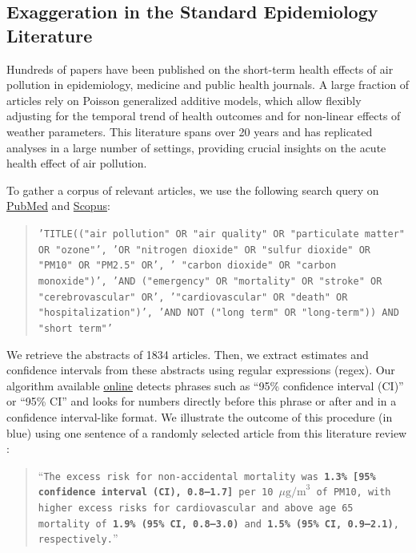 \documentclass[12pt]{article}
\begin{document}
    \subsection{Exaggeration in the Standard Epidemiology Literature}
    
        Hundreds of papers have been published on the short-term health effects of air pollution in epidemiology, medicine and public health journals. A large fraction of articles rely on Poisson generalized additive models, which allow flexibly adjusting for the temporal trend of health outcomes and for non-linear effects of weather parameters. This literature spans over 20 years and has replicated analyses in a large number of settings, providing crucial insights on the acute health effect of air pollution. 
    
        To gather a corpus of relevant articles, we use the following search query on \href{https://www.ncbi.nlm.nih.gov/}{PubMed} and \href{https://www.scopus.com/home.uri}{Scopus}:
               
        \begin{quote}
       \footnotesize\texttt{'TITLE(("air pollution" OR "air quality" OR "particulate matter" OR "ozone"', 'OR "nitrogen dioxide" OR "sulfur dioxide" OR "PM10" OR "PM2.5" OR', ' "carbon dioxide" OR "carbon monoxide")',  'AND ("emergency" OR "mortality" OR "stroke" OR "cerebrovascular" OR', '"cardiovascular" OR "death" OR "hospitalization")', 'AND NOT ("long term" OR "long-term")) AND "short term"'}
        \end{quote}

       \noindent We retrieve the abstracts of 1834 articles. Then, we extract estimates and confidence intervals from these abstracts using regular expressions (regex). Our algorithm available \href{https://vincentbagilet.github.io/inference_pollution/automatic_lit_review_getting_abstracts.html}{online} detects phrases such as “95\% confidence interval (CI)” or “95\% CI” and looks for numbers directly before this phrase or after and in a confidence interval-like format. We illustrate the outcome of this procedure (in blue) using one sentence of a randomly selected article from this literature review \citep{vichit-vadakan_public_2008}:
        
\begin{sloppypar}
        \begin{quote}
         \footnotesize    “\texttt{The excess risk for non-accidental mortality was \textbf{\color{cerulean}1.3\% [95\% confidence interval (CI), 0.8–1.7]} per 10 $\mu \text{g/m}^3$ of PM10, with higher excess risks for cardiovascular and above age 65 mortality of \textbf{\color{cerulean}1.9\% (95\% CI, 0.8–3.0)} and \textbf{\color{cerulean}1.5\% (95\% CI, 0.9–2.1)}, respectively.}”
        \end{quote}
\end{sloppypar}
\end{document}
